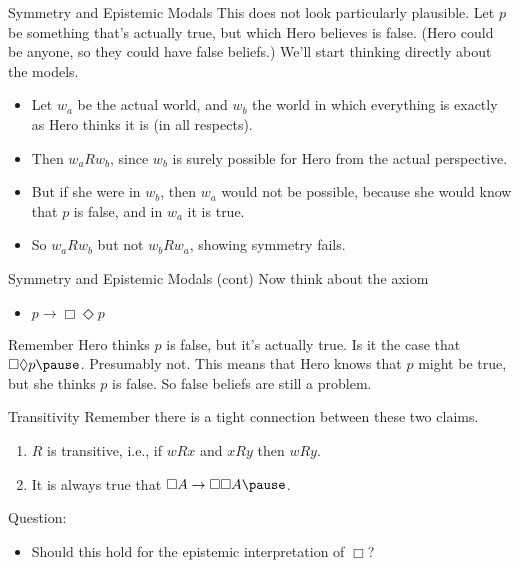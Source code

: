 \documentclass[
  ignorenonframetext,
]{beamer}
\providecommand{\tightlist}{%
  \setlength{\itemsep}{0pt}\setlength{\parskip}{0pt}}
\renewcommand{\,}{\text{, }}
\begin{document}
\begin{frame}{Symmetry and Epistemic Modals}
\protect\hypertarget{symmetry-and-epistemic-modals}{}
This does not look particularly plausible. Let \(p\) be something that's
actually true, but which Hero believes is false. (Hero could be anyone,
so they could have false beliefs.) We'll start thinking directly about
the models.

\begin{itemize}
\tightlist
\item
  Let \(w_a\) be the actual world, and \(w_b\) the world in which
  everything is exactly as Hero thinks it is (in all respects).
\item
  Then \(w_aRw_b\), since \(w_b\) is surely possible for Hero from the
  actual perspective.
\item
  But if she were in \(w_b\), then \(w_a\) would not be possible,
  because she would know that \(p\) is false, and in \(w_a\) it is true.
\item
  So \(w_aRw_b\) but not \(w_bRw_a\), showing symmetry fails.
\end{itemize}
\end{frame}

\begin{frame}{Symmetry and Epistemic Modals (cont)}
\protect\hypertarget{symmetry-and-epistemic-modals-cont}{}
Now think about the axiom

\begin{itemize}
\tightlist
\item
  \(p \rightarrow \Box \Diamond p\)
\end{itemize}

Remember Hero thinks \(p\) is false, but it's actually true. Is it the
case that \(\Box \Diamond p \pause\). Presumably not. This means that
Hero knows that \(p\) might be true, but she thinks \(p\) is false. So
false beliefs are still a problem.
\end{frame}

\begin{frame}{Transitivity}
\protect\hypertarget{transitivity}{}
Remember there is a tight connection between these two claims.

\begin{enumerate}
\tightlist
\item
  \(R\) is transitive, i.e., if \(wRx\) and \(xRy\) then \(wRy\).
\item
  It is always true that \(\Box A \rightarrow \Box \Box A \pause\).
\end{enumerate}

Question:

\begin{itemize}
\tightlist
\item
  Should this hold for the epistemic interpretation of \(\Box\)?
\end{itemize}
\end{frame}
\end{document}
